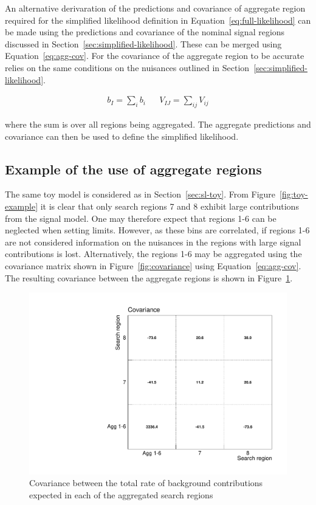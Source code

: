 An alternative derivaration of the predictions and covariance of aggregate region 
required for the simplified likelihood definition in Equation~\ref{eq:full-likelihood} can
be made using the predictions and covariance of the nominal signal regions discussed in 
Section~\ref{sec:simplified-likelihood}.
These can be merged using Equation~\ref{eq:agg-cov}. For the covariance of the aggregate
region to be accurate relies on the same conditions on the nuisances outlined 
in Section~\ref{sec:simplified-likelihood}. 

\begin{align}
b_{I} = \sum_i b_{i} && V_{IJ}=\sum_{ij}V_{ij}
\label{eq:agg-cov}
\end{align}

where the sum is over all regions being aggregated. The aggregate predictions
and covariance can then be used to define the simplified likelihood.

\subsection{Example of the use of aggregate regions}
\label{sec:agg-toy}

The same toy model is considered as in Section~\ref{sec:sl-toy}. From Figure~\ref{fig:toy-example}
it is clear that only search regions 7 and 8 exhibit large contributions from the signal
model. One may therefore expect that regions 1-6 can be neglected when setting limits. 
However, as these bins are correlated, if regions 1-6 are not considered information 
on the nuisances in the regions with large signal contributions is lost. 
Alternatively, the regions 1-6 may be aggregated using the covariance matrix shown in 
Figure~\ref{fig:covariance} using Equation~\ref{eq:agg-cov}. The resulting covariance
between the aggregate regions is shown in Figure~\ref{fig:agg-covariance}.

\begin{figure}[hbt]
  \begin{center} 
   \includegraphics[width=1.5\cmsFigWidth]{figures/agg_htsearch_covariance.pdf}
   \caption{Covariance between the total rate of background contributions expected in each of the aggregated search regions}
   \label{fig:agg-covariance} 
  \end{center}
\end{figure}

